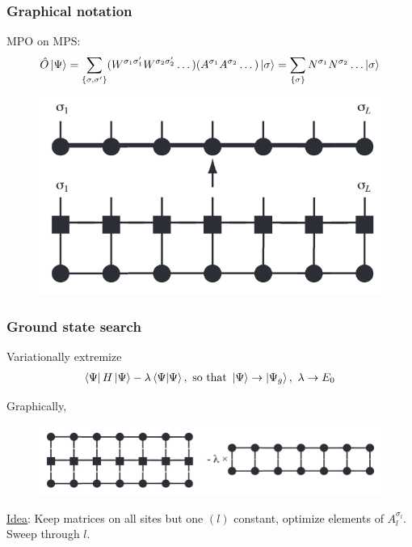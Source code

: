 \documentclass{beamer}
\theoremstyle{definition}
\begin{document}
\begin{frame}
	\frametitle{Graphical notation}
	MPO on MPS:
	\begin{align*}
		\hat{O}\ket{\Psi} 
		= \sum_{\{\sigma,\sigma'\}} (W^{\sigma_1\sigma_1'}W^{\sigma_2\sigma_2'}\dots)(A^{\sigma_1}A^{\sigma_2}\dots) \ket{\sigma} 
		= \sum_{\{\sigma\}} N^{\sigma_1}N^{\sigma_2}\dots \ket{\sigma}
 	\end{align*}
 	\begin{figure}[!htb]
 		\centering
 		\includegraphics[scale=0.3]{mpo_on_mps.png}
 	\end{figure}
\end{frame}




\begin{frame}
	\frametitle{Ground state search}
	Variationally extremize 
	\begin{align*}
		\bra{\Psi} H \ket{\Psi} - \lambda \braket{\Psi}, \text{ so that }  \ket{\Psi} \to \ket{\Psi_g},\,\, \lambda \to E_0
	\end{align*}

	
	\vspace{10pt}
	
	Graphically,
	\begin{figure}[!htb]
		\centering
		\includegraphics[scale=0.3]{gnd_state_search.png}
	\end{figure}
	\underline{Idea}: Keep matrices on all sites but one $(l)$ constant, optimize elements of $A^{\sigma_l}_{l}$. Sweep through $l$.
\end{frame}
\end{document}
